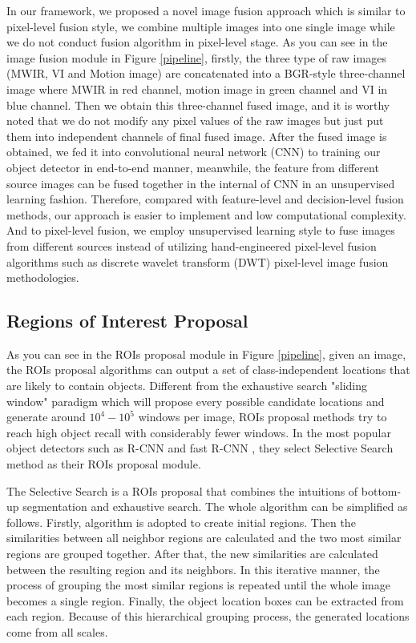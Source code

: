 \documentclass[journal]{IEEEtran}
\begin{document}
In our framework, we proposed a novel image fusion approach which is similar to pixel-level fusion style, we combine multiple images into one single image while we do not conduct fusion algorithm in pixel-level stage. As you can see in the image fusion module in Figure \ref{pipeline}, firstly, the three type of raw images (MWIR, VI and Motion image) are concatenated into a BGR-style three-channel image where MWIR in red channel, motion image in green channel and VI in blue channel. Then we obtain this three-channel fused image, and it is worthy noted that we do not modify any pixel values of the raw images but just put them into independent channels of final fused image. After the fused image is obtained, we fed it into convolutional neural network (CNN) to training our object detector in end-to-end manner, meanwhile, the feature from different source images can be fused together in the internal of CNN in an unsupervised learning fashion. Therefore, compared with feature-level and decision-level fusion methods, our approach is easier to implement and low computational complexity. And to pixel-level fusion, we employ unsupervised learning style to fuse images from different sources instead of utilizing hand-engineered pixel-level fusion algorithms such as discrete wavelet transform (DWT) pixel-level image fusion methodologies.


\subsection{Regions of Interest Proposal}
As you can see in the ROIs proposal module in Figure \ref{pipeline}, given an image, the ROIs proposal algorithms can output a set of class-independent locations that are likely to contain objects. Different from the exhaustive search "sliding window" paradigm which will propose every possible candidate locations and generate around $10^4-10^5$ windows per image, ROIs proposal methods try to reach high object recall with considerably fewer windows. In the most popular object detectors such as R-CNN \cite{GirshickRichSegmentation} and fast R-CNN \cite{Girshick2016}, they select Selective Search \cite{Uijlings2013SelectiveRecognition} method as their ROIs proposal module. 


The Selective Search \cite{Uijlings2013SelectiveRecognition} is a ROIs proposal that combines the intuitions of bottom-up segmentation and exhaustive search. The whole algorithm can be simplified as follows. Firstly, \cite{Felzenszwalb2004EfficientSegmentation} algorithm is adopted to create initial regions. Then the similarities between all neighbor regions are calculated and the two most similar regions are grouped together. After that, the new similarities are calculated between the resulting region and its neighbors. In this iterative manner, the process of grouping the most similar regions is repeated until the whole image becomes a single region. Finally, the object location boxes can be extracted from each region. Because of this hierarchical grouping process, the generated locations come from all scales.
\end{document}
